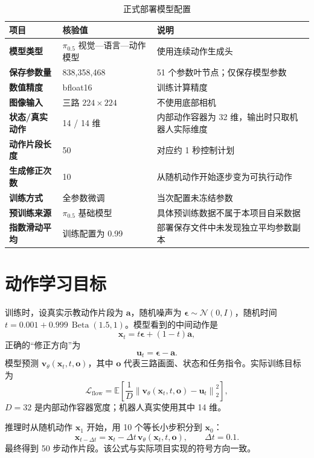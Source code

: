 \begin{table}[H]
\centering
\caption{正式部署模型配置}
\begin{tabularx}{\textwidth}{>{\bfseries}p{38mm}p{35mm}X}
\toprule
项目 & 核验值 & 说明\\
\midrule
模型类型 & $\pi_{0.5}$ 视觉—语言—动作模型 & 使用连续动作生成头\\
保存参数量 & 838,358,468 & 51 个参数叶节点；仅保存模型参数\\
数值精度 & bfloat16 & 训练计算精度\\
图像输入 & 三路 $224\times224$ & 不使用底部相机\\
状态/真实动作 & 14 / 14 维 & 内部动作容器为 32 维，输出时只取机器人实际维度\\
动作片段长度 & 50 & 对应约 1 秒控制计划\\
生成修正次数 & 10 & 从随机动作开始逐步变为可执行动作\\
训练方式 & 全参数微调 & 当次配置未冻结参数\\
预训练来源 & $\pi_{0.5}$ 基础模型 & 具体预训练数据不属于本项目自采数据\\
指数滑动平均 & 训练配置为 0.99 & 部署保存文件中未发现独立平均参数副本\\
\bottomrule
\end{tabularx}
\end{table}

\section{动作学习目标}

训练时，设真实示教动作片段为 $\mathbf{a}$，随机噪声为
$\boldsymbol{\epsilon}\sim\mathcal{N}(0,I)$，随机时间
$t=0.001+0.999\,\operatorname{Beta}(1.5,1)$。模型看到的中间动作是
\[
\mathbf{x}_t=t\boldsymbol{\epsilon}+(1-t)\mathbf{a},
\]
正确的“修正方向”为
\[
\mathbf{u}_t=\boldsymbol{\epsilon}-\mathbf{a}.
\]
模型预测 $\mathbf{v}_\theta(\mathbf{x}_t,t,\mathbf{o})$，其中
$\mathbf{o}$ 代表三路画面、状态和任务指令。实际训练目标为
\[
\mathcal{L}_{\mathrm{flow}}
=\mathbb{E}\!\left[
\frac{1}{D}\left\|
\mathbf{v}_\theta(\mathbf{x}_t,t,\mathbf{o})-\mathbf{u}_t
\right\|_2^2\right],
\]
$D=32$ 是内部动作容器宽度；机器人真实使用其中 14 维。


推理时从随机动作 $\mathbf{x}_1$ 开始，用 10 个等长小步积分到 $\mathbf{x}_0$：
\[
\mathbf{x}_{t-\Delta t}
=\mathbf{x}_{t}-\Delta t\,\mathbf{v}_\theta(\mathbf{x}_t,t,\mathbf{o}),
\qquad \Delta t=0.1.
\]
最终得到 50 步动作片段。该公式与实际项目实现的符号方向一致。

